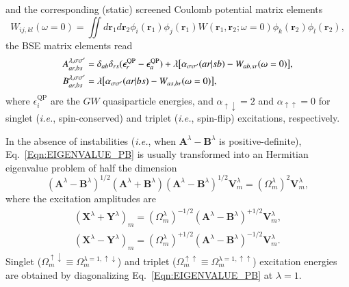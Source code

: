 \documentclass[aps,prb,reprint,superscriptaddress]{revtex4-1}
\newcommand{\br}{\boldsymbol{r}}
\newcommand{\dbr}{d\br}
\newcommand{\IS}{\lambda}
\newcommand{\singlet}{\uparrow\downarrow}
\newcommand{\triplet}{\uparrow\uparrow}
\newcommand{\eps}{\epsilon}
\newcommand{\A}[2]{A_{#1}^{#2}}
\newcommand{\B}[2]{B_{#1}^{#2}}
\newcommand{\MO}[1]{\phi_{#1}}
\newcommand{\ERI}[2]{(#1|#2)}
\newcommand{\Om}[2]{\Omega_{#1}^{#2}}
\newcommand{\bA}[1]{\boldsymbol{A}^{#1}}
\newcommand{\bB}[1]{\boldsymbol{B}^{#1}}
\newcommand{\bX}[1]{\boldsymbol{X}^{#1}}
\newcommand{\bY}[1]{\boldsymbol{Y}^{#1}}
\newcommand{\bZ}[2]{\boldsymbol{V}_{#1}^{#2}}
\newcommand{\ie}{\textit{i.e.}}
\begin{document}
and the corresponding (static) screened Coulomb potential matrix elements 
\begin{equation}
	W_{ij,kl}(\omega=0) = \iint \dbr_1 \dbr_2  \MO{i}(\br_1) \MO{j}(\br_1) W(\br_1,\br_2; \omega=0 ) \MO{k}(\br_2) \MO{l}(\br_2),
\end{equation}
the BSE matrix elements read \citep{Maggio_2016}
\begin{subequations}
\begin{align}
	\label{eq:LR_BSE-A}
	\A{ar,bs}{\IS,\sigma\sigma'} & = \delta_{ab} \delta_{rs} (\eps_r^\text{QP} - \eps_a^\text{QP}) + \IS \qty[ \alpha_{\sigma\sigma'} \ERI{ar}{sb}   -  W_{ab,sr}(\omega=0) ],
	\\ 
	\label{eq:LR_BSE-B}
	\B{ar,bs}{\IS,\sigma\sigma'} & =  \IS \qty[ \alpha_{\sigma\sigma'} \ERI{ar}{bs} -   W_{as,br}(\omega=0) ],
\end{align}
\end{subequations}
where $\eps_i^\text{QP}$ are the $GW$ quasiparticle energies, and $\alpha_{\singlet}=2$ and $\alpha_{\triplet}=0$ for singlet (\ie, spin-conserved) and triplet (\ie, spin-flip) excitations, respectively. 

In the absence of instabilities (\ie, when $\bA{\IS} - \bB{\IS}$ is positive-definite), \citep{Dreuw_2005} Eq.~\eqref{Eqn:EIGENVALUE_PB} is usually transformed into an Hermitian eigenvalue problem of half the dimension
\begin{equation}
	(\bA{\IS} - \bB{\IS})^{1/2} (\bA{\IS} + \bB{\IS}) (\bA{\IS} - \bB{\IS})^{1/2} \bZ{m}{\IS} = (\Om{m}{\IS})^2 \bZ{m}{\IS},
	\label{Eqn:BSE_smaller}
\end{equation}
where the excitation amplitudes are
\begin{subequations}
\begin{align}
	(\bX{\IS} + \bY{\IS})_m = (\Om{m}{\IS})^{-1/2} (\bA{\IS} - \bB{\IS})^{+1/2} \bZ{m}{\IS},
	\\
	(\bX{\IS} - \bY{\IS})_m = (\Om{m}{\IS})^{+1/2} (\bA{\IS} - \bB{\IS})^{-1/2} \bZ{m}{\IS}.
\end{align}
\end{subequations}
Singlet ($\Om{m}{\singlet} \equiv \Om{m}{\IS=1,\singlet}$) and triplet ($\Om{m}{\triplet} \equiv \Om{m}{\IS=1,\triplet}$) excitation energies are obtained by diagonalizing Eq.~\eqref{Eqn:EIGENVALUE_PB} at $\IS=1$. 



\end{document}
